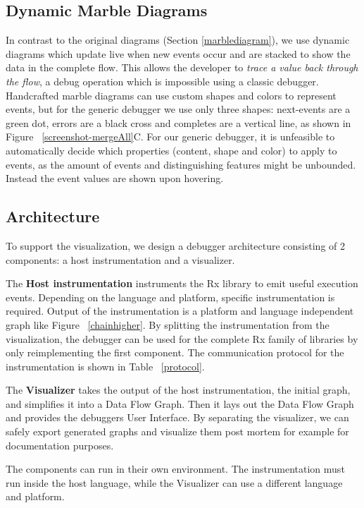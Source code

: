 \subsection{Dynamic Marble Diagrams} In contrast to the original
diagrams (Section%
\ref{marblediagram}), we use dynamic diagrams which update live when new
events occur and are stacked to show the data in the complete flow.
This allows the developer to \emph{trace a value back through the flow},
a debug operation which is impossible using a classic debugger.
Handcrafted marble diagrams can use custom shapes and colors to
represent events, but for the generic debugger we use only three shapes:
next-events are a green dot, errors are a black cross and completes are
a vertical line, as shown in Figure~%
\ref{screenshot-mergeAll}C.  For our generic debugger, it is unfeasible
to automatically decide which properties (content, shape and color) to
apply to events, as the amount of events and distinguishing features
might be unbounded.  Instead the event values are shown upon hovering.

\subsection{Architecture} To support the visualization, we design a
debugger architecture consisting of 2 components:  a host
instrumentation and a visualizer.

The \textbf{Host instrumentation} instruments the Rx library to emit
useful execution events.  Depending on the language and platform,
specific instrumentation is required.  Output of the instrumentation is
a platform and language independent graph like Figure~%
\ref{chainhigher}.  By splitting the instrumentation from the
visualization, the debugger can be used for the complete Rx family of
libraries by only reimplementing the first component.  The communication
protocol for the instrumentation is shown in Table~%
\ref{protocol}.

The \textbf{Visualizer} takes the output of the host instrumentation,
the initial graph, and simplifies it into a Data Flow Graph.  Then it
lays out the Data Flow Graph and provides the debuggers User Interface.
By separating the visualizer, we can safely export generated graphs and
visualize them post mortem for example for documentation purposes.

The components can run in their own environment.  The instrumentation
must run inside the host language, while the Visualizer can use a
different language and platform.

